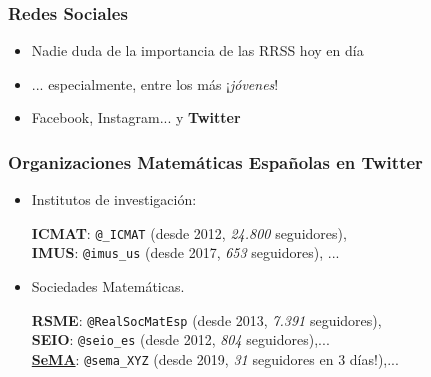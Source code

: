 
\begin{frame}
  \titlepage
\end{frame}

\begin{frame}
  \frametitle{Redes Sociales}
  \begin{itemize}
    \item Nadie duda de la importancia de las RRSS hoy en día
    \item ... especialmente, entre los más ¡\textit{jóvenes}!
    \item Facebook, Instagram...
    \pause
    y \textbf{Twitter}
  \end{itemize}
\end{frame}

\begin{frame}
  \frametitle{Organizaciones Matemáticas Españolas en Twitter}
  \begin{itemize}
  \item Institutos de investigación:\par
    \begin{small}
    \textbf{ICMAT}: \texttt{\makeatletter @\_ICMAT} (desde 2012, \textit{24.800} seguidores),
      \\
    \textbf{IMUS}: \texttt{\makeatletter @imus\_us} (desde 2017, \textit{653} seguidores), ...
  \end{small}
  \item Sociedades Matemáticas.\par
    \begin{small}
      \textbf{RSME}: \texttt{\makeatletter @RealSocMatEsp} (desde 2013, \textit{7.391} seguidores),
      \\
    \textbf{SEIO}: \texttt{\makeatletter @seio\_es} (desde 2012, \textit{804} seguidores),...
      \\
      \pause
      \href{https://twitter.com/sema\_informa}{\textbf{SeMA}}:
      \texttt{\makeatletter @sema\_XYZ} (desde 2019, \textit{31}
      seguidores en 3 días!),...
  \end{small}
  \end{itemize}
\end{frame}

\begin{frame}
\end{frame}


